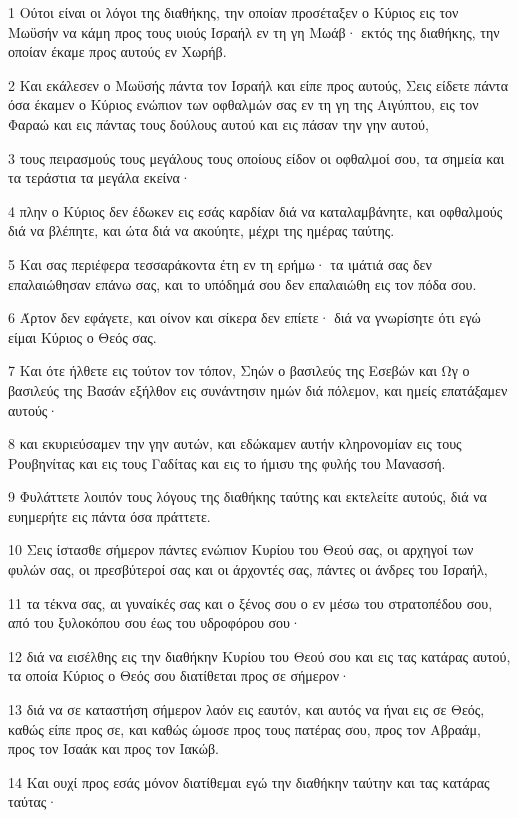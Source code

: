 \par 1 Ούτοι είναι οι λόγοι της διαθήκης, την οποίαν προσέταξεν ο Κύριος εις τον Μωϋσήν να κάμη προς τους υιούς Ισραήλ εν τη γη Μωάβ· εκτός της διαθήκης, την οποίαν έκαμε προς αυτούς εν Χωρήβ.
\par 2 Και εκάλεσεν ο Μωϋσής πάντα τον Ισραήλ και είπε προς αυτούς, Σεις είδετε πάντα όσα έκαμεν ο Κύριος ενώπιον των οφθαλμών σας εν τη γη της Αιγύπτου, εις τον Φαραώ και εις πάντας τους δούλους αυτού και εις πάσαν την γην αυτού,
\par 3 τους πειρασμούς τους μεγάλους τους οποίους είδον οι οφθαλμοί σου, τα σημεία και τα τεράστια τα μεγάλα εκείνα·
\par 4 πλην ο Κύριος δεν έδωκεν εις εσάς καρδίαν διά να καταλαμβάνητε, και οφθαλμούς διά να βλέπητε, και ώτα διά να ακούητε, μέχρι της ημέρας ταύτης.
\par 5 Και σας περιέφερα τεσσαράκοντα έτη εν τη ερήμω· τα ιμάτιά σας δεν επαλαιώθησαν επάνω σας, και το υπόδημά σου δεν επαλαιώθη εις τον πόδα σου.
\par 6 Άρτον δεν εφάγετε, και οίνον και σίκερα δεν επίετε· διά να γνωρίσητε ότι εγώ είμαι Κύριος ο Θεός σας.
\par 7 Και ότε ήλθετε εις τούτον τον τόπον, Σηών ο βασιλεύς της Εσεβών και Ωγ ο βασιλεύς της Βασάν εξήλθον εις συνάντησιν ημών διά πόλεμον, και ημείς επατάξαμεν αυτούς·
\par 8 και εκυριεύσαμεν την γην αυτών, και εδώκαμεν αυτήν κληρονομίαν εις τους Ρουβηνίτας και εις τους Γαδίτας και εις το ήμισυ της φυλής του Μανασσή.
\par 9 Φυλάττετε λοιπόν τους λόγους της διαθήκης ταύτης και εκτελείτε αυτούς, διά να ευημερήτε εις πάντα όσα πράττετε.
\par 10 Σεις ίστασθε σήμερον πάντες ενώπιον Κυρίου του Θεού σας, οι αρχηγοί των φυλών σας, οι πρεσβύτεροί σας και οι άρχοντές σας, πάντες οι άνδρες του Ισραήλ,
\par 11 τα τέκνα σας, αι γυναίκές σας και ο ξένος σου ο εν μέσω του στρατοπέδου σου, από του ξυλοκόπου σου έως του υδροφόρου σου·
\par 12 διά να εισέλθης εις την διαθήκην Κυρίου του Θεού σου και εις τας κατάρας αυτού, τα οποία Κύριος ο Θεός σου διατίθεται προς σε σήμερον·
\par 13 διά να σε καταστήση σήμερον λαόν εις εαυτόν, και αυτός να ήναι εις σε Θεός, καθώς είπε προς σε, και καθώς ώμοσε προς τους πατέρας σου, προς τον Αβραάμ, προς τον Ισαάκ και προς τον Ιακώβ.
\par 14 Και ουχί προς εσάς μόνον διατίθεμαι εγώ την διαθήκην ταύτην και τας κατάρας ταύτας·

